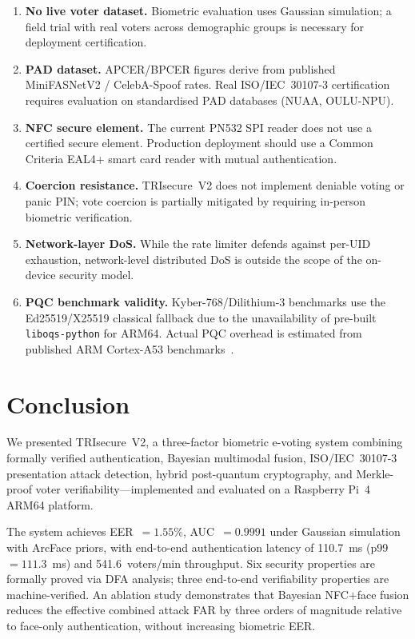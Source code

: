 \documentclass[pdflatex,sn-mathphys-num]{sn-jnl}%
\theoremstyle{thmstyleone}%
\theoremstyle{thmstyletwo}%
\theoremstyle{thmstylethree}%
\begin{document}
\begin{enumerate}
  \item \textbf{No live voter dataset.} Biometric evaluation uses Gaussian
    simulation; a field trial with real voters across demographic groups is
    necessary for deployment certification.
  \item \textbf{PAD dataset.} APCER/BPCER figures derive from published
    MiniFASNetV2 / CelebA-Spoof rates. Real ISO/IEC~30107-3 certification
    requires evaluation on standardised PAD databases (NUAA, OULU-NPU).
  \item \textbf{NFC secure element.} The current PN532 SPI reader does not use a
    certified secure element. Production deployment should use a Common Criteria
    EAL4+ smart card reader with mutual authentication.
  \item \textbf{Coercion resistance.} TRIsecure~V2 does not implement deniable
    voting or panic PIN; vote coercion is partially mitigated by requiring
    in-person biometric verification.
  \item \textbf{Network-layer DoS.} While the rate limiter defends against
    per-UID exhaustion, network-level distributed DoS is outside the scope of the
    on-device security model.
  \item \textbf{PQC benchmark validity.} Kyber-768/Dilithium-3 benchmarks use
    the Ed25519/X25519 classical fallback due to the unavailability of pre-built
    \texttt{liboqs-python} for ARM64. Actual PQC overhead is estimated from
    published ARM Cortex-A53 benchmarks~\cite{sikeridis2020pqc}.
\end{enumerate}

\section{Conclusion}\label{sec:conclusion}

We presented TRIsecure~V2, a three-factor biometric e-voting system combining
formally verified authentication, Bayesian multimodal fusion, ISO/IEC~30107-3
presentation attack detection, hybrid post-quantum cryptography, and Merkle-proof
voter verifiability—implemented and evaluated on a Raspberry Pi~4 ARM64 platform.

The system achieves EER~$=1.55\%$, AUC~$=0.9991$ under Gaussian simulation with
ArcFace priors, with end-to-end authentication latency of 110.7~ms
(p99~$=111.3$~ms) and 541.6~voters/min throughput. Six security properties are
formally proved via DFA analysis; three end-to-end verifiability properties are
machine-verified. An ablation study demonstrates that Bayesian NFC$+$face fusion
reduces the effective combined attack FAR by three orders of magnitude relative
to face-only authentication, without increasing biometric EER.
\end{document}
